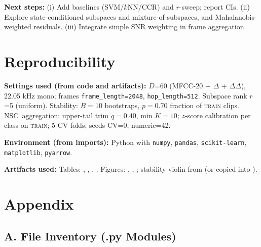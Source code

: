 \documentclass[11pt]{article}
\newcommand{\D}{\ensuremath{D}\xspace}
\newcommand{\rankr}{\ensuremath{r}\xspace}
\newcommand{\NSC}{NSC\xspace}
\begin{document}
\textbf{Next steps:} (i) Add baselines (SVM/$k$NN/CCR) and \rankr-sweep; report CIs. (ii) Explore state-conditioned subspaces and mixture-of-subspaces, and Mahalanobis-weighted residuals. (iii) Integrate simple SNR weighting in frame aggregation.

\section{Reproducibility}

\textbf{Settings used (from code and artifacts):} \D=60 (MFCC-20 + $\Delta$ + $\Delta\Delta$), 22.05 kHz mono; frames \texttt{frame\_length=2048}, \texttt{hop\_length=512}. Subspace rank \rankr=5 (uniform). Stability: $B=10$ bootstraps, $p=0.70$ fraction of \textsc{train} clips. \NSC\ aggregation: upper-tail trim $q=0.40$, min $K=10$; $z$-score calibration per class on \textsc{train}; 5 CV folds; seeds CV=0, numeric=42.

\textbf{Environment (from imports):} Python with \texttt{numpy}, \texttt{pandas}, \texttt{scikit-learn}, \texttt{matplotlib}, \texttt{pyarrow}.

\textbf{Artifacts used:} Tables: , , , . Figures: , , ; stability violin from  (or copied into ).

\section*{Appendix}

\subsection*{A. File Inventory (.py Modules)}
\end{document}
